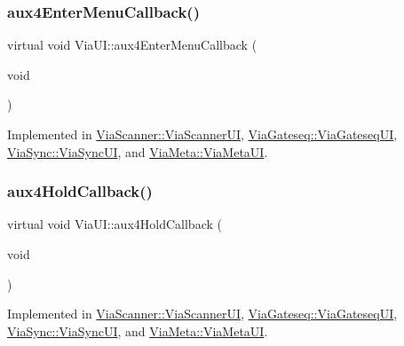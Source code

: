 \mbox{\label{class_via_u_i_a36cc4bac8f774c2a59ab8635be05f884}} 
\subsubsection{\texorpdfstring{aux4\+Enter\+Menu\+Callback()}{aux4EnterMenuCallback()}}
{\footnotesize\ttfamily virtual void Via\+U\+I\+::aux4\+Enter\+Menu\+Callback (\begin{DoxyParamCaption}\item[{void}]{ }\end{DoxyParamCaption})\hspace{0.3cm}{\ttfamily [pure virtual]}}



Implemented in \mbox{\hyperlink{class_via_scanner_1_1_via_scanner_u_i_a34c593dfd035906c09a2cde0024fd48f}{Via\+Scanner\+::\+Via\+Scanner\+UI}}, \mbox{\hyperlink{class_via_gateseq_1_1_via_gateseq_u_i_a78f330f4c02acb69f9c2321a8187f8dc}{Via\+Gateseq\+::\+Via\+Gateseq\+UI}}, \mbox{\hyperlink{class_via_sync_1_1_via_sync_u_i_ab74dfab193404bd23e90ba1b44a0a743}{Via\+Sync\+::\+Via\+Sync\+UI}}, and \mbox{\hyperlink{class_via_meta_1_1_via_meta_u_i_aa6309c2403a8436cc3ec222f7914b202}{Via\+Meta\+::\+Via\+Meta\+UI}}.

\mbox{\label{class_via_u_i_a884790ab6dac8e6f49104146ff620512}} 
\subsubsection{\texorpdfstring{aux4\+Hold\+Callback()}{aux4HoldCallback()}}
{\footnotesize\ttfamily virtual void Via\+U\+I\+::aux4\+Hold\+Callback (\begin{DoxyParamCaption}\item[{void}]{ }\end{DoxyParamCaption})\hspace{0.3cm}{\ttfamily [pure virtual]}}



Implemented in \mbox{\hyperlink{class_via_scanner_1_1_via_scanner_u_i_af994cf63aa7becc41c9e3dcb2e08d8c2}{Via\+Scanner\+::\+Via\+Scanner\+UI}}, \mbox{\hyperlink{class_via_gateseq_1_1_via_gateseq_u_i_a98c59b4566672aeb522f6cafccd46b72}{Via\+Gateseq\+::\+Via\+Gateseq\+UI}}, \mbox{\hyperlink{class_via_sync_1_1_via_sync_u_i_a15f48c7e1d5f77292ee46d997421cd4e}{Via\+Sync\+::\+Via\+Sync\+UI}}, and \mbox{\hyperlink{class_via_meta_1_1_via_meta_u_i_a2a1cfb3452d150af61f61716aa94f782}{Via\+Meta\+::\+Via\+Meta\+UI}}.

